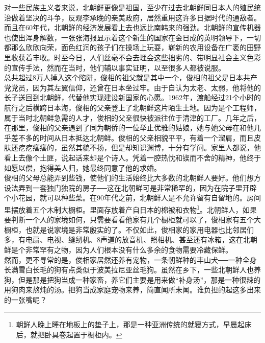 对一些民族主义者来说，北朝鲜更像是祖国，至少在过去北朝鲜同日本人的殖民统治做着坚决的斗争，反观李承晚的亲美政府，居然重用这许多日据时代的通敌者。而且在60年代，北朝鲜的经济发展看上去也远比南韩来的强劲。北朝鲜的宣传机器也使出浑身解数，一张张海报显示着这个新生的国家在金日成的英明领导下，一切都那么欣欣向荣，面色红润的孩子们在操场上玩耍，崭新的农用设备在广袤的田野里收获着丰收。时至今日，人们丝毫不会去理会这些拙劣的、带明显社会主义色彩的宣传手法，然而在当时，他们辅以事实证明，以至很多人都被说服。\\

总共超过8万人掉入这个陷阱，俊相的祖父就是其中一个，俊相的祖父是日本共产党党员，因为其左翼信仰，还曾在日本坐过牢。由于自认为太老、太弱，他将他的长子送回到北朝鲜，代替他实现建设新国家的心愿。1962年，渡船经过21个小时的航行之后横跨日本海，俊相的父亲登上了北朝鲜这片陌生土地。因为是个工程师，属于当时北朝鲜急需的人才，俊相的父亲很快被派往位于清津的工厂。几年之后，在那里，俊相的父亲遇到了同为朝侨的一位举止优雅的姑娘，她与她父母在和他几乎差不多的时间从日本抵达北朝鲜。俊相的父亲相貌平平，有着一个溜肩，而且皮肤还疙疙瘩瘩的，虽然其貌不扬，但是却知识渊博，十分有学问。家里人都说，他看上去像个土匪，说起话来却是个诗人。凭着一腔热忱和锲而不舍的精神，他终于如愿以偿，抱得美人归，她最终同意了他的求婚。\\

俊相的父母总能弄到些钱，使他们的生活始终比大多数的北朝鲜人要好。他们想方设法弄到一套独门独院的房子──这在北朝鲜可是非常稀罕的，因为在院子里开辟个小花园，就可以种些菜。在90年代之前，北朝鲜人是不允许留有自留地的。房间里摆放着五个木制大橱柜。里面存放着产自日本的棉被和衣物\footnote{朝鲜人晚上睡在地板上的垫子上，那是一种亚洲传统的就寝方式，早晨起床后，就把卧具卷起置于橱柜内。}。北朝鲜人，如果要判断一个人的家境如何，只需要看看他家有几个橱柜就可以了，俊相家有五个大橱柜，也就是说家境是非常殷实的了。不仅如此，俊相家的家用电器也比邻居们多，有电扇、电视、缝纫机、8声道的放音机、照相机、甚至还有冰箱，这在北朝鲜是个非常罕有之物，因为人们根本没有什么多余的食物需要冷藏保鲜。\\

然而，更不寻常的是，俊相家居然还养有宠物，一条朝鲜种的丰山犬──一种全身长满雪白长毛的狗有点类似于波美拉尼亚丝毛狗。虽然在乡下，一些北朝鲜人也养狗，但是那是把狗当成一种家畜，养它们主要是用来做“补身汤”，那是一种很辣的用狗肉来熬炖的汤。把狗当成家庭宠物来养，简直闻所未闻。谁负担的起这多出来的一张嘴呢？\\

